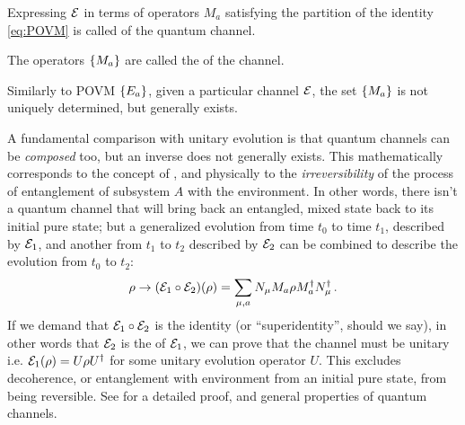Expressing $\mathcal{E}$ in terms of operators $M_a$
satisfying the partition of the identity \eqref{eq:POVM}
is called
 of the quantum channel.

The operators $\left\{M_a\right\}$ are called the 
of the channel.

Similarly to POVM $\left\{E_a\right\}$, given a particular channel $\mathcal{E}$,
the set $\left\{M_a\right\}$ is not uniquely determined, but
generally exists.

A fundamental comparison with unitary evolution is that
quantum channels can be \emph{composed} too, but an inverse
does not generally exists.
This mathematically corresponds to the concept of ,
and physically to the \emph{irreversibility} of the process
of entanglement of subsystem $A$ with the environment. In other words,
there isn't a quantum channel that will bring back an entangled,
mixed state back to its initial pure state;
but a generalized evolution from time $t_0$ to time $t_1$,
described by $\mathcal{E}_1$,
and another from $t_1$ to $t_2$ described by $\mathcal{E}_2$
can be combined to describe the evolution from $t_0$ to $t_2$:
\[
  \rho \rightarrow \qty(\mathcal{E}_1 \circ \mathcal{E}_2) (\rho) =
  \sum_{\mu,a} N_{\mu} M_a \rho M_a^{\dagger} N_{\mu}^{\dagger}
  \,\text{.}
\]
If we demand that $\mathcal{E}_1 \circ \mathcal{E}_2$
is the identity (or ``superidentity'', should we say),
in other words that $\mathcal{E}_2$
is the  of $\mathcal{E}_1$,
we can prove that the channel must be unitary i.e.
$\mathcal{E}_1(\rho) = U \rho U^{\dagger}$
for some unitary evolution operator $U$.
This excludes decoherence,
or entanglement with environment from an initial pure state,
from being reversible.
See \cite[\S 3.2]{PreskillNotes} for a detailed proof,
and general properties of quantum channels.
